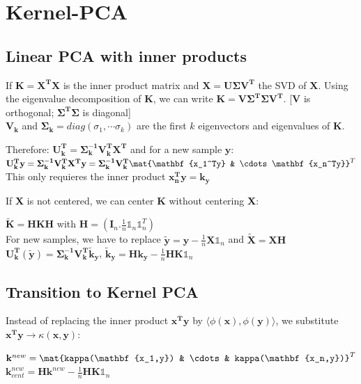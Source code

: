 \documentclass[english]{latex4ei/latex4ei_sheet}
\begin{document}
\section{Kernel-PCA}
\begin{sectionbox}
\subsection{Linear PCA with inner products}
If $\mathbf{K}=\mathbf{X^TX}$ is the inner product matrix and $\mathbf{X=U\Sigma V^T}$ the SVD of $\mathbf{X}$. Using the eigenvalue decomposition of $\mathbf{K}$, we can write $\mathbf{K=V\Sigma^T\Sigma V^T}$. [$\mathbf{V}$ is orthogonal; $\mathbf{\Sigma^T\Sigma}$ is diagonal]\\
$\mathbf{V_k}$ and $\mathbf{\Sigma_k}=diag(\sigma_1, \cdots\sigma_k)$ are the first $k$ eigenvectors and eigenvalues of $\mathbf{K}$.
\begin{emphbox}
    Therefore: $\mathbf{U_k^T}=\mathbf{\Sigma_k^{-1}V_k^TX^T}$ and for a new sample $\mathbf{y}$:\\
    $\mathbf{U_k^Ty}=\mathbf{\Sigma_k^{-1}V_k^TX^Ty}=\mathbf{\Sigma_k^{-1}V_k^T}\mat{\mathbf{x_1^Ty} & \cdots \mathbf{x_n^Ty}}^T$\\
    This only requieres the inner product $\mathbf{x_n^Ty=k_y}$
\end{emphbox}
If \textbf{X} is not centered, we can center $\mathbf{K}$ without centering \textbf{X}:
\begin{center}
    $\mathbf{\tilde{K}=HKH}$ with $\mathbf{H}=(\mathbf{I}_n.\frac{1}{n}\mathds{1}_n\mathds{1}_n^T)$\\
    For new samples, we have to replace $\mathbf{\tilde{y}}=\mathbf{y}-\frac{1}{n}\mathbf{X}\mathds{1}_n$ and $\mathbf{\tilde{X}=XH}$\\
    $\mathbf{U_k^T}(\mathbf{\tilde{y}})=\mathbf{\Sigma_k^{-1}V_k^T\tilde{k}_y}$, \quad $\mathbf{\tilde{k}_y=Hk_y-}\frac{1}{n}\mathbf{HK}\mathds{1}_n$
\end{center}

\subsection{Transition to Kernel PCA}
Instead of replacing the inner product $\mathbf{x^Ty}$ by $\langle\phi(\mathbf{x}),\phi(\mathbf{y})\rangle$, we substitute $\mathbf{x^Ty}\rightarrow\kappa(\mathbf{x,y})$:
\begin{emphbox}
    $\mathbf{k}^{new}=\mat{kappa(\mathbf{x_1,y}) & \cdots & kappa(\mathbf{x_n,y})}^T$\\
    $\mathbf{k}_{cent}^{new}=\mathbf{Hk}_{}^{new}-\frac{1}{n}\mathbf{HK}\mathds{1}_n$
\end{emphbox}
\end{sectionbox}
\end{document}
